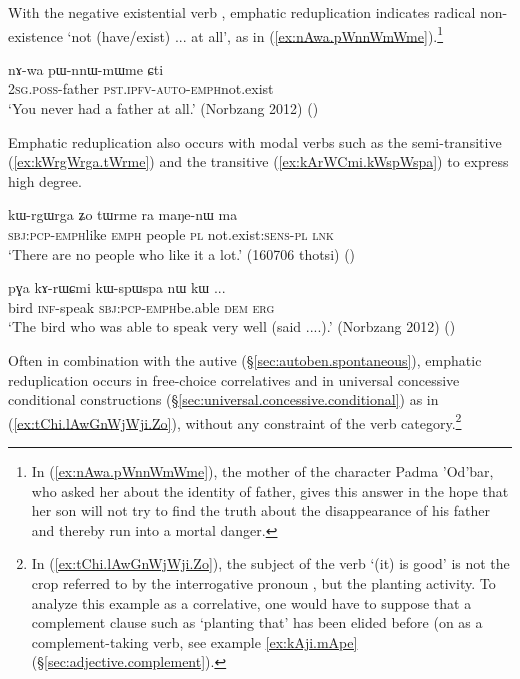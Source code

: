 With the negative existential verb , emphatic reduplication indicates radical non-existence `not (have/exist) ... at all', as in (\ref{ex:nAwa.pWnnWmWme}).\footnote{In (\ref{ex:nAwa.pWnnWmWme}), the mother of the character Padma 'Od'bar, who asked her about the identity of  father, gives this answer in the hope that her son will not try to find the truth about the disappearance of his father and thereby run into a mortal danger. }

\begin{exe}
\ex \label{ex:nAwa.pWnnWmWme}
\gll nɤ-wa pɯ-nnɯ-mɯ\redp{}me ɕti \\
 \textsc{2sg}.\textsc{poss}-father \textsc{pst}.\textsc{ipfv}-\textsc{auto}-\textsc{emph}\redp{}not.exist \\
\glt `You never had a father at all.' (Norbzang 2012) 	()
\end{exe}

Emphatic reduplication also occurs with modal verbs such as the semi-transitive   (\ref{ex:kWrgWrga.tWrme}) and the transitive  (\ref{ex:kArWCmi.kWspWspa}) to express high degree.

\begin{exe}
\ex \label{ex:kWrgWrga.tWrme}
\gll  kɯ-rgɯ\redp{}rga ʑo tɯrme ra maŋe-nɯ ma  \\
\textsc{sbj}:\textsc{pcp}-\textsc{emph}\redp{}like \textsc{emph} people \textsc{pl} not.exist:\textsc{sens}-\textsc{pl} \textsc{lnk} \\
\glt `There are no people who like it a lot.' (160706 thotsi) ()
\end{exe}

\begin{exe}
\ex \label{ex:kArWCmi.kWspWspa}
\gll pɣa kɤ-rɯɕmi kɯ-spɯ\redp{}spa nɯ kɯ ... \\
bird \textsc{inf}-speak \textsc{sbj}:\textsc{pcp}-\textsc{emph}\redp{}be.able \textsc{dem} \textsc{erg} \\
\glt `The bird who was able to speak very well (said ....).' (Norbzang 2012) ()
\end{exe}

Often in combination with the autive  (§\ref{sec:autoben.spontaneous}), emphatic reduplication occurs in free-choice correlatives and in universal concessive conditional constructions (§\ref{sec:universal.concessive.conditional}) as in (\ref{ex:tChi.lAwGnWjWji.Zo}), without any constraint of the verb category.\footnote{In (\ref{ex:tChi.lAwGnWjWji.Zo}), the subject of the verb  `(it) is good' is not the crop referred to by the interrogative pronoun , but the planting activity. To analyze this example as a correlative, one would have to suppose that a complement clause such as  `planting that' has been elided before  (on  as a complement-taking verb, see example \ref{ex:kAji.mApe} (§\ref{sec:adjective.complement}).  }

